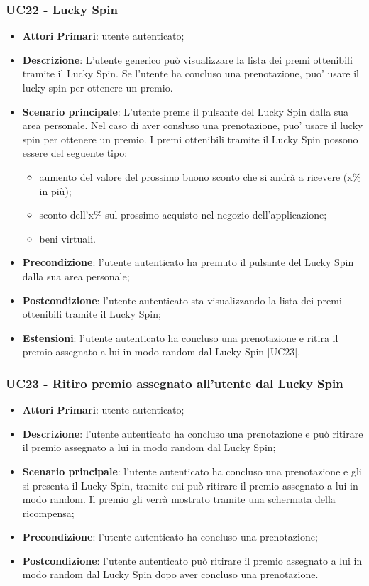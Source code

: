 

\subsubsection{UC22 - Lucky Spin}
\begin{itemize}
	\item \textbf{Attori Primari}: utente autenticato;
	\item \textbf{Descrizione}:	L'utente generico può visualizzare la lista dei premi ottenibili tramite il Lucky Spin\glo. Se l'utente ha concluso una prenotazione, puo' usare il lucky spin per ottenere un premio.
	\item \textbf{Scenario principale}: L'utente preme il pulsante del Lucky Spin dalla sua area personale. Nel caso di aver consluso una prenotazione, puo' usare il lucky spin per ottenere un premio. I premi ottenibili tramite il Lucky Spin possono essere del seguente tipo:
	\begin{itemize}
		\item aumento del valore del prossimo buono sconto che si andrà a ricevere (x\% in più);
		\item sconto dell'x\% sul prossimo acquisto nel negozio dell'applicazione;
		\item beni virtuali.
	\end{itemize}
	\item \textbf{Precondizione}: l'utente autenticato ha premuto il pulsante del Lucky Spin dalla sua area personale;
	\item \textbf{Postcondizione}: l'utente autenticato sta visualizzando la lista dei premi ottenibili tramite il Lucky Spin;
	\item \textbf{Estensioni}: l'utente autenticato ha concluso una prenotazione e ritira il premio assegnato a lui in modo random dal Lucky Spin [UC23].
\end{itemize}
\subsubsection{UC23 - Ritiro premio assegnato all'utente dal Lucky Spin}
\begin{itemize}
	\item \textbf{Attori Primari}: utente autenticato;
	\item \textbf{Descrizione}: l'utente autenticato ha concluso una prenotazione e può ritirare il premio assegnato a lui in modo random dal Lucky Spin;	
	\item \textbf{Scenario principale}: l'utente autenticato ha concluso una prenotazione e gli si presenta il Lucky Spin, tramite cui può ritirare il premio assegnato a lui in modo random. Il premio gli verrà mostrato tramite una schermata della ricompensa;
	\item \textbf{Precondizione}: l'utente autenticato ha concluso una prenotazione;
	\item \textbf{Postcondizione}: l'utente autenticato può ritirare il premio assegnato a lui in modo random dal Lucky Spin dopo aver concluso una prenotazione.
\end{itemize}

